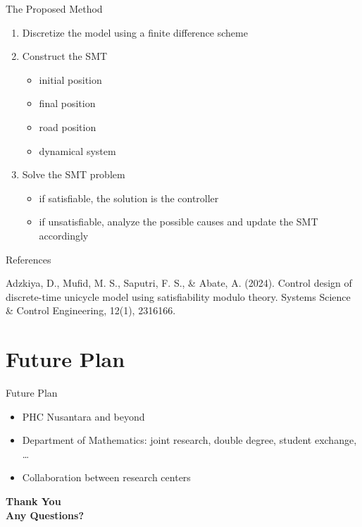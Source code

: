 \documentclass[aspectratio=169]{beamer} %
\begin{document}
	\begin{frame}{The Proposed Method}
		
		\begin{enumerate}
			\item Discretize the model using a finite difference scheme
			\item Construct the SMT
			\begin{itemize}
				\item initial position
				\item final position
				\item road position
				\item dynamical system
			\end{itemize}
			\item Solve the SMT problem
			\begin{itemize}
				\item if satisfiable, the solution is the controller
				\item if unsatisfiable, analyze the possible causes and update the SMT accordingly
			\end{itemize}
		\end{enumerate}
		
	\end{frame}
	
	\begin{frame}{References}
		
		Adzkiya, D., Mufid, M. S., Saputri, F. S., \& Abate, A. (2024). Control design of discrete-time unicycle model using satisfiability modulo theory. Systems Science \& Control Engineering, 12(1), 2316166.
		
	\end{frame}
	
	\section{Future Plan}
	
	\begin{frame}{Future Plan}
	
	\begin{itemize}
		\item PHC Nusantara and beyond
		\item Department of Mathematics: joint research, double degree, student exchange, \dots
		\item Collaboration between research centers
	\end{itemize}
	
	\vfill
	
	\begin{center}
		\Large\bfseries\color{ITSBiruTua} Thank You \\
		\vspace{0.3cm}
		\large\color{ITSBiruMuda} Any Questions?
	\end{center}
		
	\end{frame}
	
\end{document}
